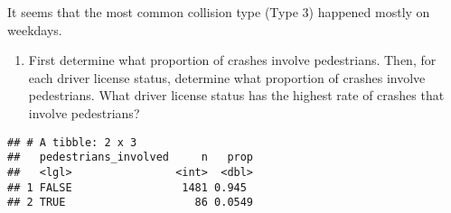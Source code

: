 \documentclass[]{article}
\newenvironment{Shaded}{\begin{snugshade}}{\end{snugshade}}
\newcommand{\KeywordTok}[1]{\textcolor[rgb]{0.13,0.29,0.53}{\textbf{#1}}}
\newcommand{\DataTypeTok}[1]{\textcolor[rgb]{0.13,0.29,0.53}{#1}}
\newcommand{\DecValTok}[1]{\textcolor[rgb]{0.00,0.00,0.81}{#1}}
\newcommand{\StringTok}[1]{\textcolor[rgb]{0.31,0.60,0.02}{#1}}
\newcommand{\CommentTok}[1]{\textcolor[rgb]{0.56,0.35,0.01}{\textit{#1}}}
\newcommand{\OperatorTok}[1]{\textcolor[rgb]{0.81,0.36,0.00}{\textbf{#1}}}
\newcommand{\NormalTok}[1]{#1}
\providecommand{\tightlist}{%
  \setlength{\itemsep}{0pt}\setlength{\parskip}{0pt}}
\begin{document}
It seems that the most common collision type (Type 3) happened mostly on
weekdays.

\begin{enumerate}
\def\labelenumi{\alph{enumi}.}
\setcounter{enumi}{3}
\tightlist
\item
  First determine what proportion of crashes involve pedestrians. Then,
  for each driver license status, determine what proportion of crashes
  involve pedestrians. What driver license status has the highest rate
  of crashes that involve pedestrians?
\end{enumerate}

\begin{Shaded}
\end{Shaded}

\begin{verbatim}
## # A tibble: 2 x 3
##   pedestrians_involved     n   prop
##   <lgl>                <int>  <dbl>
## 1 FALSE                 1481 0.945 
## 2 TRUE                    86 0.0549
\end{verbatim}

\begin{Shaded}
\end{Shaded}
\end{document}
